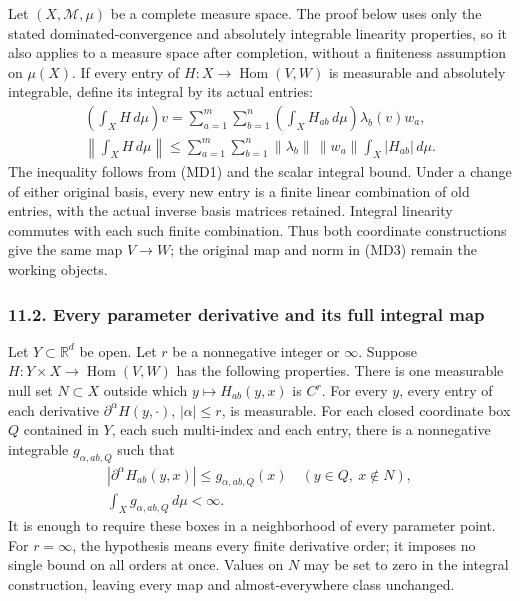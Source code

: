 \documentclass[
  11pt,
]{article}
\begin{document}
Let \((X,\mathcal M,\mu)\) be a complete measure space. The proof below
uses only the stated dominated-convergence and absolutely integrable
linearity properties, so it also applies to a measure space after
completion, without a finiteness assumption on \(\mu(X)\). If every
entry of \(H:X\to\operatorname{Hom}(V,W)\) is measurable and absolutely
integrable, define its integral by its actual entries: \[
\begin{gathered}
\left(\int_X H\,d\mu\right)v=\sum_{a=1}^m\sum_{b=1}^n
\left(\int_X H_{ab}\,d\mu\right)\lambda_b(v)w_a,\\
\left\|\int_X H\,d\mu\right\|\leq\sum_{a=1}^m\sum_{b=1}^n
\|\lambda_b\|\,\|w_a\|\int_X|H_{ab}|\,d\mu .
\end{gathered}
\tag{MD3}
\] The inequality follows from (MD1) and the scalar integral bound.
Under a change of either original basis, every new entry is a finite
linear combination of old entries, with the actual inverse basis
matrices retained. Integral linearity commutes with each such finite
combination. Thus both coordinate constructions give the same map
\(V\to W\); the original map and norm in (MD3) remain the working
objects.

\subsubsection{11.2. Every parameter derivative and its full integral
map}\label{every-parameter-derivative-and-its-full-integral-map}

Let \(Y\subset\mathbb R^d\) be open. Let \(r\) be a nonnegative integer
or \(\infty\). Suppose \(H:Y\times X\to\operatorname{Hom}(V,W)\) has the
following properties. There is one measurable null set \(N\subset X\)
outside which \(y\mapsto H_{ab}(y,x)\) is \(C^r\). For every \(y\),
every entry of each derivative \(\partial^\alpha H(y,\cdot)\),
\(|\alpha|\leq r\), is measurable. For each closed coordinate box \(Q\)
contained in \(Y\), each such multi-index and each entry, there is a
nonnegative integrable \(g_{\alpha,ab,Q}\) such that \[
\begin{gathered}
|\partial^\alpha H_{ab}(y,x)|\leq g_{\alpha,ab,Q}(x)
\quad(y\in Q,\ x\notin N),\\
\int_Xg_{\alpha,ab,Q}\,d\mu<\infty .
\end{gathered}
\tag{MD4}
\] It is enough to require these boxes in a neighborhood of every
parameter point. For \(r=\infty\), the hypothesis means every finite
derivative order; it imposes no single bound on all orders at once.
Values on \(N\) may be set to zero in the integral construction, leaving
every map and almost-everywhere class unchanged.
\end{document}
